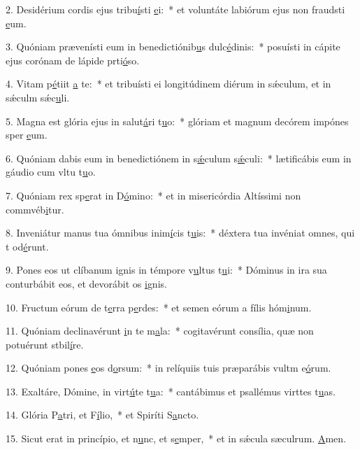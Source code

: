 2. Desidérium cordis ejus tribu\uline{í}sti \uline{e}i:~* et voluntáte labiórum ejus non fraudsti \uline{e}um.\par 
3. Quóniam prævenísti eum in benedictiónib\uline{u}s dulc\uline{é}dinis:~* posuísti in cápite ejus corónam de lápide prti\uline{ó}so.\par 
4. Vitam p\uline{é}tiit \uline{a} te:~* et tribuísti ei longitúdinem diérum in sǽculum, et in sǽculm sǽc\uline{u}li.\par 
5. Magna est glória ejus in salut\uline{á}ri t\uline{u}o:~* glóriam et magnum decórem impónes sper \uline{e}um.\par 
6. Quóniam dabis eum in benedictiónem in s\uline{ǽ}culum s\uline{ǽ}culi:~* lætificábis eum in gáudio cum vltu t\uline{u}o.\par 
7. Quóniam rex sp\uline{e}rat in D\uline{ó}mino:~* et in misericórdia Altíssimi non commvéb\uline{i}tur.\par 
8. Inveniátur manus tua ómnibus inim\uline{í}cis t\uline{u}is:~* déxtera tua invéniat omnes, qui t od\uline{é}runt.\par 
9. Pones eos ut clíbanum ignis in témpore v\uline{u}ltus t\uline{u}i:~* Dóminus in ira sua conturbábit eos, et devorábit os \uline{i}gnis.\par 
10. Fructum eórum de t\uline{e}rra p\uline{e}rdes:~* et semen eórum a fílis hóm\uline{i}num.\par 
11. Quóniam declinavérunt \uline{i}n te m\uline{a}la:~* cogitavérunt consília, quæ non potuérunt stbil\uline{í}re.\par 
12. Quóniam pones \uline{e}os d\uline{o}rsum:~* in relíquiis tuis præparábis vultm e\uline{ó}rum.\par 
13. Exaltáre, Dómine, in virt\uline{ú}te t\uline{u}a:~* cantábimus et psallémus virttes t\uline{u}as.\par 
14. Glória P\uline{a}tri, et F\uline{í}lio,~* et Spiríti S\uline{a}ncto.\par 
15. Sicut erat in princípio, et n\uline{u}nc, et s\uline{e}mper,~* et in sǽcula sæculrum. \uline{A}men.\par 
